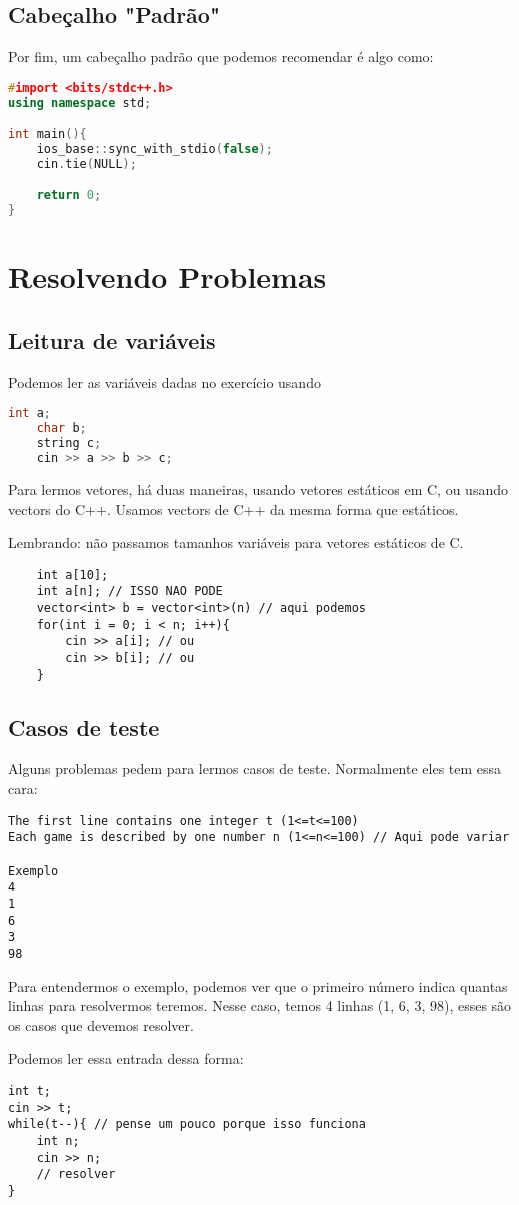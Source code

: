 \documentclass{article}
\begin{document}
\subsection{Cabeçalho "Padrão"}
Por fim, um cabeçalho padrão que podemos recomendar é algo como:

\begin{lstlisting}[language=C++]
#import <bits/stdc++.h>
using namespace std;

int main(){
    ios_base::sync_with_stdio(false);
    cin.tie(NULL);

    return 0;
}

\end{lstlisting}

\section{Resolvendo Problemas}
\subsection{Leitura de variáveis}
Podemos ler as variáveis dadas no exercício usando

\begin{lstlisting}[language=C++]
    int a;
    char b;
    string c;
    cin >> a >> b >> c;
\end{lstlisting}

Para lermos vetores, há duas maneiras, usando vetores estáticos em C, ou usando vectors do C++.
Usamos vectors de C++ da mesma forma que estáticos.

Lembrando: não passamos tamanhos variáveis para vetores estáticos de C.

\begin{lstlisting}
    int a[10];
    int a[n]; // ISSO NAO PODE
    vector<int> b = vector<int>(n) // aqui podemos
    for(int i = 0; i < n; i++){
        cin >> a[i]; // ou
        cin >> b[i]; // ou
    } 
\end{lstlisting}

\subsection{Casos de teste}
Alguns problemas pedem para lermos casos de teste.
Normalmente eles tem essa cara:

\begin{verbatim}
The first line contains one integer t (1<=t<=100)
Each game is described by one number n (1<=n<=100) // Aqui pode variar

Exemplo
4
1
6
3
98
\end{verbatim}

Para entendermos o exemplo, podemos ver que o primeiro número indica quantas linhas para resolvermos teremos.
Nesse caso, temos 4 linhas (1, 6, 3, 98), esses são os casos que devemos resolver.

Podemos ler essa entrada dessa forma:

\begin{lstlisting}
int t;
cin >> t;
while(t--){ // pense um pouco porque isso funciona
    int n;
    cin >> n;
    // resolver
}
\end{lstlisting}
\end{document}
